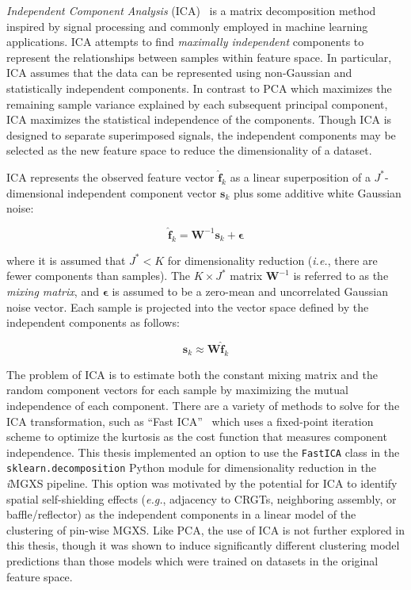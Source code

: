 \textit{Independent Component Analysis} (ICA)~\cite{hyvarinen2000ica} is a matrix decomposition method inspired by signal processing and commonly employed in machine learning applications. ICA attempts to find \textit{maximally independent} components to represent the relationships between samples within feature space. In particular, ICA assumes that the data can be represented using non-Gaussian and statistically independent components. In contrast to PCA which maximizes the remaining sample variance explained by each subsequent principal component, ICA maximizes the statistical independence of the components. Though ICA is designed to separate superimposed signals, the independent components may be selected as the new feature space to reduce the dimensionality of a dataset.


ICA represents the observed feature vector $\boldsymbol{\hat{f}}_{k}$ as a linear superposition of a $J^{*}$-dimensional independent component vector $\boldsymbol{s}_{k}$ plus some additive white Gaussian noise:

\begin{equation}
\label{eqn:chap10-ica-project}
\boldsymbol{\hat{f}}_{k} = \boldsymbol{W}^{-1}\boldsymbol{s}_{k} + \boldsymbol{\epsilon}
\end{equation}

\noindent where it is assumed that $J^{*} < K$ for dimensionality reduction (\textit{i.e.}, there are fewer components than samples). The $K \times J^{*}$ matrix $\boldsymbol{W}^{-1}$ is referred to as the \textit{mixing matrix}, and $\boldsymbol{\epsilon}$ is assumed to be a zero-mean and uncorrelated Gaussian noise vector. Each sample is projected into the vector space defined by the independent components as follows:

\begin{equation}
\label{eqn:chap10-ica-inverse}
\boldsymbol{s}_{k} \approx \boldsymbol{W}\boldsymbol{\hat{f}}_{k}
\end{equation}

The problem of ICA is to estimate both the constant mixing matrix and the random component vectors for each sample by maximizing the mutual independence of each component. There are a variety of methods to solve for the ICA transformation, such as ``Fast ICA''~\cite{hyvarinen1999fastica} which uses a fixed-point iteration scheme to optimize the kurtosis as the cost function that measures component independence. This thesis implemented an option to use the \texttt{FastICA} class in the \texttt{sklearn.decomposition} Python module for dimensionality reduction in the \textit{i}\ac{MGXS} pipeline. This option was motivated by the potential for ICA to identify spatial self-shielding effects (\textit{e.g.}, adjacency to \acp{CRGT}, neighboring assembly, or baffle/reflector) as the independent components in a linear model of the clustering of pin-wise \ac{MGXS}. Like PCA, the use of ICA is not further explored in this thesis, though it was shown to induce significantly different clustering model predictions than those models which were trained on datasets in the original feature space.

